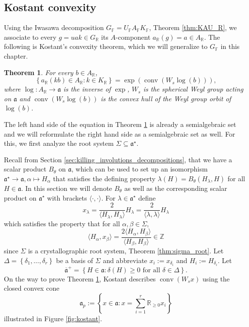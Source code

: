 \documentclass[12pt]{amsart}
\newcommand{\F}{\mathbb{F} }
\newcommand{\R}{\mathbb{R} }
\newcommand{\Z}{\mathbb{Z} }
\newcommand{\fraka}{\mathfrak{a}}
\newcommand{\frakap}{\overline{\mathfrak{a}}^+}
\numberwithin{equation}{section}
\newtheorem{theorem}{Theorem}[section]
\theoremstyle{remark} %
\begin{document}
\subsection{Kostant convexity}\label{sec:kostant}
Using the Iwasawa decomposition $G_\F=U_\F A_\F K_\F$, Theorem \ref{thm:KAU_R}, we associate to every $g=uak\in G_\R$ its $A$-component $a_\R(g) = a \in A_\R$. The following is Kostant's convexity theorem, which we will generalize to $G_\F$ in this chapter.
\begin{theorem}\cite[Theorem 4.1]{Kos}\label{thm:kostant_R}
	For every $b \in A_\R$, 
	$$
	\left\{ a_\R(kb) \in A_\R \colon k \in K_\R \right\} = \exp \left( \operatorname{conv}(W_s \log(b)) \right),
	$$
	where $\log \colon A_\R \to \fraka$ is the inverse of $\exp$, $W_s$ is the spherical Weyl group acting on $\fraka$ and $\operatorname{conv}(W_s \log(b))$ is the convex hull of the Weyl group orbit of $\log(b)$.
\end{theorem}
The left hand side of the equation in Theorem \ref{thm:kostant_R} is already a semialgebraic set and we will reformulate the right hand side as a semialgebraic set as well. For this, we first analyze the root system $\Sigma \subseteq \fraka^\star$.

Recall from Section \ref{sec:killing_involutions_decompositions}, that we have a scalar product $B_\theta$ on $\fraka$, which can be used to set up an isomorphism $\fraka^\star \to \fraka, \alpha \mapsto H_\alpha$ that satisfies the defining property $\lambda(H) = B_\theta(H_\lambda, H)$ for all $H \in \fraka$. In this section we will denote $B_\theta$ as well as the corresponding scalar product on $\fraka^\star$ with brackets $\langle \cdot , \cdot \rangle$. For $\lambda \in \fraka^\star$ define 
$$
x_\lambda = \frac{2}{\langle H_\lambda, H_\lambda \rangle } H_\lambda  =  \frac{2}{\langle \lambda, \lambda \rangle } H_\lambda
$$
which satisfies the property that for all $\alpha, \beta \in \Sigma$,
$$
\langle H_\alpha, x_\beta \rangle = \frac{2 \langle H_\alpha, H_\beta \rangle }{\langle H_\beta, H_\beta\rangle} \in \Z
$$
since $\Sigma$ is a crystallographic root system, Theorem \ref{thm:sigma_root}. Let $\Delta = \left\{ \delta_1, \ldots , \delta_r \right\}$ be a basis of $\Sigma$ and abbreviate $x_i := x_{\delta_i}$ and $H_i := H_{\delta_i}$. Let 
$$
\frakap = \left\{ H \in \fraka \colon \delta(H) \geq 0 \text{ for all } \delta \in \Delta \right\}. 
$$
On the way to prove Theorem \ref{thm:kostant_R}, Kostant describes $\operatorname{conv}(W_s x)$ using the closed convex cone
$$
\fraka_p := \left\{ x \in \fraka \colon x = \sum_{i=1}^r \R_{\geq 0}x_i \right\}
$$
illustrated in Figure \ref{fig:kostant}.
\end{document}
